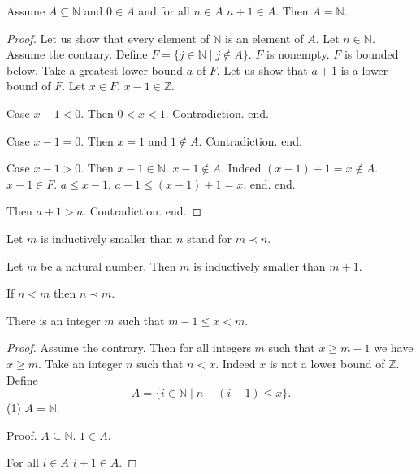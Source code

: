 \documentclass{article}
\begin{document}
\begin{forthel}

\begin{theorem}
Assume $A \subseteq \mathbb{N}$
and $0 \in A$ and for all $n \in A$ $n + 1 \in A$.
Then $A = \mathbb{N}$.
\end{theorem}

\begin{proof}
Let us show that every element of $\mathbb{N}$ is an element of $A$.
	Let $n \in \mathbb{N}$.
	Assume the contrary.
	Define $F = \{  j \in \mathbb{N} \mid j \notin A\}$.
	$F$ is nonempty. $F$ is bounded below.
  Take a greatest lower bound $a$ of $F$.
	Let us show that $a+1$ is a lower bound of $F$.
		Let $x \in F$. $x - 1 \in \mathbb{Z}$.

		Case $x - 1 < 0$. Then $0 < x < 1$. Contradiction. end.

		Case $x - 1 = 0$. Then $x = 1$ and $1 \notin A$. Contradiction. end.

		Case $x - 1 > 0$. Then $x - 1 \in \mathbb{N}$.
      $x - 1 \notin A$. Indeed $(x - 1) + 1 = x \notin A$. $x - 1 \in F$.
			$a \leq x - 1$.
			$a + 1 \leq (x - 1) + 1 = x$.
		end.
	end.

	Then $a+1 > a$.
	Contradiction.
end.
\end{proof}

Let $m$ is inductively smaller than $n$ stand for $m \prec n$.

\begin{axiom} Let $m$ be a natural number. Then
$m$ is inductively smaller than $m+1$.
\end{axiom}

\begin{axiom}
If $n < m$ then $n \prec m$.
\end{axiom}




\begin{lemma}
There is an integer $m$ such that
$m -1 \leq x < m$.
\end{lemma}
\begin{proof}
Assume the contrary.
Then for all integers $m$ such that $x \geq m-1 $ we have $x \geq m$.
Take an integer $n$ such that $n < x$. Indeed $x$ is not a lower bound of $\mathbb{Z}$.
Define
\[ A = \{i \in \mathbb{N} \mid n + (i - 1) \leq x\}. \]
(1) $A = \mathbb{N}$.

Proof.
$A \subseteq \mathbb{N}$.
$1 \in A$.

For all $i \in A$ $i + 1 \in A$.


\end{proof}
\end{forthel}
\end{document}
